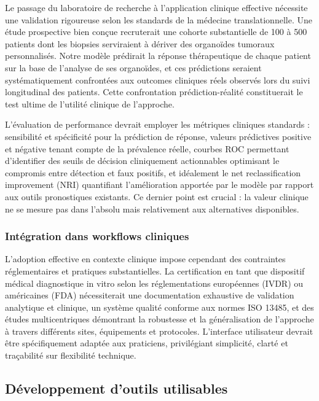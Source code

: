 Le passage du laboratoire de recherche à l'application clinique effective nécessite une validation rigoureuse selon les standards de la médecine translationnelle. Une étude prospective bien conçue recruterait une cohorte substantielle de 100 à 500 patients dont les biopsies serviraient à dériver des organoïdes tumoraux personnalisés. Notre modèle prédirait la réponse thérapeutique de chaque patient sur la base de l'analyse de ses organoïdes, et ces prédictions seraient systématiquement confrontées aux outcomes cliniques réels observés lors du suivi longitudinal des patients. Cette confrontation prédiction-réalité constituerait le test ultime de l'utilité clinique de l'approche.

L'évaluation de performance devrait employer les métriques cliniques standards : sensibilité et spécificité pour la prédiction de réponse, valeurs prédictives positive et négative tenant compte de la prévalence réelle, courbes ROC permettant d'identifier des seuils de décision cliniquement actionnables optimisant le compromis entre détection et faux positifs, et idéalement le net reclassification improvement (NRI) quantifiant l'amélioration apportée par le modèle par rapport aux outils pronostiques existants. Ce dernier point est crucial : la valeur clinique ne se mesure pas dans l'absolu mais relativement aux alternatives disponibles.

\subsubsection{Intégration dans workflows cliniques}

L'adoption effective en contexte clinique impose cependant des contraintes réglementaires et pratiques substantielles. La certification en tant que dispositif médical diagnostique in vitro selon les réglementations européennes (IVDR) ou américaines (FDA) nécessiterait une documentation exhaustive de validation analytique et clinique, un système qualité conforme aux normes ISO 13485, et des études multicentriques démontrant la robustesse et la généralisation de l'approche à travers différents sites, équipements et protocoles. L'interface utilisateur devrait être spécifiquement adaptée aux praticiens, privilégiant simplicité, clarté et traçabilité sur flexibilité technique.

\subsection{Développement d'outils utilisables}

